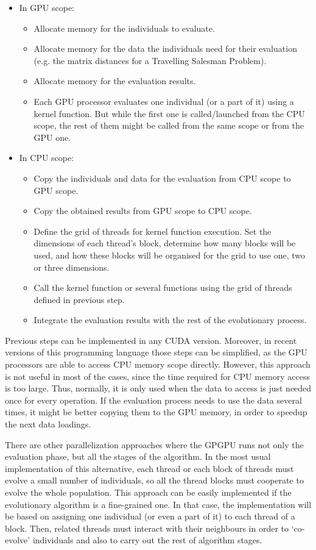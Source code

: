 \documentclass{article}
\begin{document}
\begin{itemize}
\item In GPU scope:
	\begin{itemize}
		\item Allocate memory for the individuals to evaluate.
		\item Allocate memory for the data the individuals need for their evaluation (e.g. the matrix distances for a Travelling Salesman Problem).
		\item Allocate memory for the evaluation results.
		\item Each GPU processor evaluates one individual (or a part of it) using a kernel function. But while the first one is called/launched from the CPU scope, the rest of them might be called from the same scope or from the GPU one.
	\end{itemize}  
\item In CPU scope:
	\begin{itemize}
		\item Copy the individuals and data for the evaluation from CPU scope to GPU scope.
		\item Copy the obtained results from GPU scope to CPU scope. 
		\item Define the grid of threads for kernel function execution. Set the dimensions of each thread's block, determine how many blocks will be used, and how these blocks will be organised for the grid to use one, two or three dimensions.
		\item Call the kernel function or several functions using the grid of threads defined in previous step.
		\item Integrate the evaluation results with the rest of the evolutionary process.
	\end{itemize}  
\end{itemize}

Previous steps can be implemented in any CUDA version. Moreover, in
recent versions of this programming language those steps can be
simplified, as the GPU processors are able to access CPU memory scope
directly. 
However, this approach is not useful in most of the cases, since the
time required for CPU memory access is too large. Thus, normally, it
is only used when the data to access is just needed once for every
operation. If the evaluation process needs to use the data several
times, it might be better copying them to the GPU memory, in order to
speedup the next data loadings. %

There are other parallelization approaches where the GPGPU runs not
only the evaluation phase, but all the stages of the algorithm.  
In the most usual implementation of this alternative, each thread or each block of threads must evolve a small number of individuals, so all the thread blocks must cooperate to evolve the whole population. 
This approach can be easily implemented if the evolutionary algorithm is a fine-grained one. 
In that case, the implementation will be based on assigning one
individual (or even a part of it) to each thread of a block. Then,
related threads must interact with their neighbours in order to
`co-evolve' individuals and also to carry out the rest of algorithm
stages.  
\end{document}
